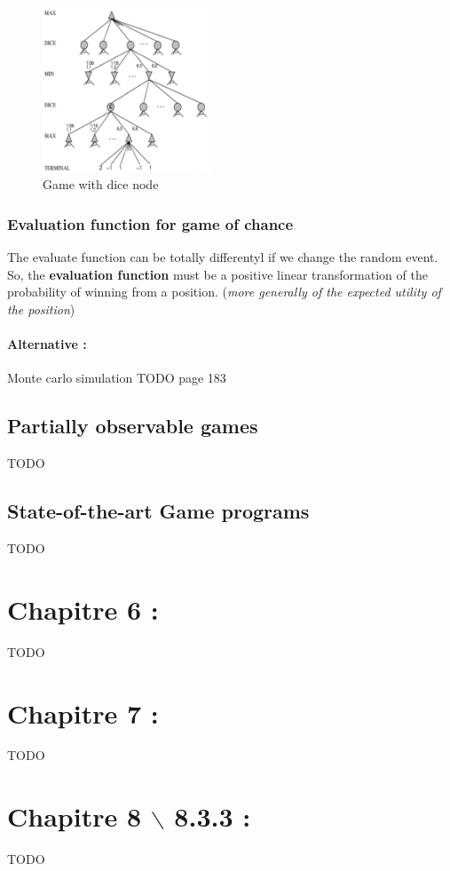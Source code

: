 \begin{figure}[h]
    \centering
    \includegraphics[width=5cm]{stochastic.png}
    \caption{Game with dice node}
\end{figure}


\subsubsection{Evaluation  function for  game  of  chance} 

The  evaluate function  can  be  totally differentyl  if  we change  the
random event.  So, the \textbf{evaluation  function} must be  a positive
linear transformation  of the  probability of  winning from  a position.
(\textit{more generally of the expected utility of the position})

\paragraph{Alternative :} Monte carlo simulation 
TODO page 183


\subsection{Partially observable games}
TODO

\subsection{State-of-the-art Game programs}
TODO


\section{Chapitre 6 : }
TODO

\section{Chapitre 7 : }
TODO

\section{Chapitre 8 $\backslash$ 8.3.3 : }
TODO

